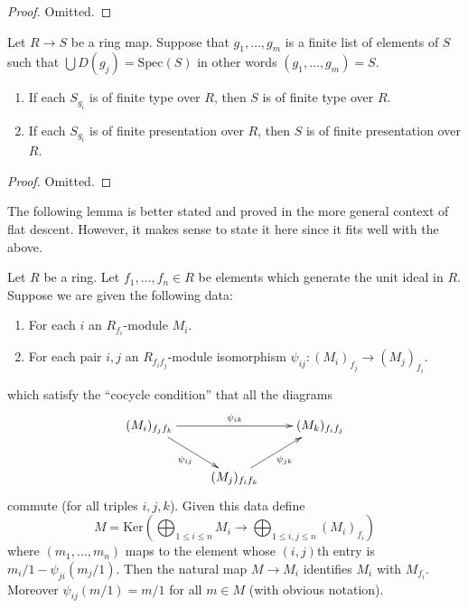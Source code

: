 \begin{proof}
Omitted.
\end{proof}

\begin{lemma}
\label{lemma-cover-upstairs}
Let $R \to S$ be a ring map.
Suppose that $g_1, \ldots, g_m$ is a finite list of
elements of $S$ such that $\bigcup D(g_j) = \text{Spec}(S)$
in other words $(g_1, \ldots, g_m) = S$.
\begin{enumerate}
\item If each $S_{g_i}$ is of finite type over $R$, then $S$ is
of finite type over $R$.
\item If each $S_{g_i}$ is of finite presentation over $R$,
then $S$ is of finite presentation over $R$.
\end{enumerate}
\end{lemma}

\begin{proof}
Omitted.
\end{proof}

\noindent
The following lemma is better stated and proved in the more general
context of flat descent. However, it makes sense to state it here
since it fits well with the above.

\begin{lemma}
\label{lemma-glue-modules}
Let $R$ be a ring. Let $f_1, \ldots, f_n \in R$ be elements
which generate the unit ideal in $R$. Suppose we are given
the following data:
\begin{enumerate}
\item For each $i$ an $R_{f_i}$-module $M_i$.
\item For each pair $i, j$ an $R_{f_if_j}$-module isomorphism
$\psi_{ij} : (M_i)_{f_j} \to (M_j)_{f_i}$.
\end{enumerate}
which satisfy the ``cocycle condition'' that all the diagrams
$$
\xymatrix{
(M_i)_{f_jf_k}
\ar[rd]_{\psi_{ij}}
\ar[rr]^{\psi_{ik}}
& &
(M_k)_{f_if_j} \\
&
(M_j)_{f_if_k} \ar[ru]_{\psi_{jk}}
}
$$
commute (for all triples $i, j, k$). Given this data define
$$
M = \text{Ker}\left(
\bigoplus\nolimits_{1 \leq i \leq n} M_i
\longrightarrow
\bigoplus\nolimits_{1 \leq i, j \leq n} (M_i)_{f_i}
\right)
$$
where $(m_1, \ldots, m_n)$ maps to the element whose
$(i, j)$th entry is $m_i/1 - \psi_{ji}(m_j/1)$.
Then the natural map $M \to M_i$ identifies
$M_i$ with $M_{f_i}$. Moreover $\psi_{ij}(m/1) = m/1$
for all $m \in M$ (with obvious notation).
\end{lemma}

